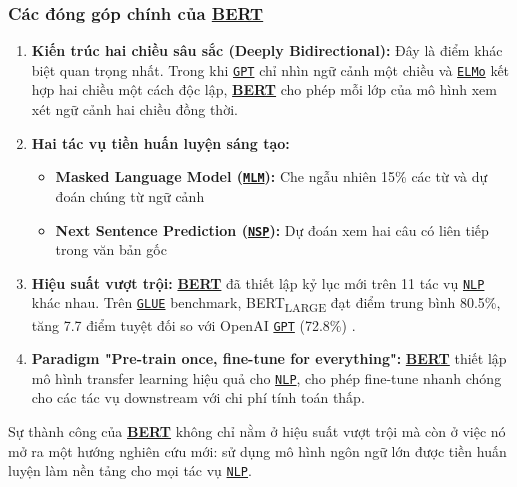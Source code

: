 \subsubsection{Các đóng góp chính của \hyperref[acro:bert]{\textbf{BERT}}}
\begin{enumerate}
    \item \textbf{Kiến trúc hai chiều sâu sắc (Deeply Bidirectional):} Đây là điểm khác biệt quan trọng nhất. Trong khi \hyperref[acro:gpt]{\texttt{GPT}} chỉ nhìn ngữ cảnh một chiều và \hyperref[acro:elmo]{\texttt{ELMo}} kết hợp hai chiều một cách độc lập, \hyperref[acro:bert]{\textbf{BERT}} cho phép mỗi lớp của mô hình xem xét ngữ cảnh hai chiều đồng thời.
    
    \item \textbf{Hai tác vụ tiền huấn luyện sáng tạo:}
    \begin{itemize}
        \item \textbf{Masked Language Model (\hyperref[acro:mlm]{\texttt{MLM}}):} Che ngẫu nhiên 15\% các từ và dự đoán chúng từ ngữ cảnh
        \item \textbf{Next Sentence Prediction (\hyperref[acro:nsp]{\texttt{NSP}}):} Dự đoán xem hai câu có liên tiếp trong văn bản gốc
    \end{itemize}
    
    \item \textbf{Hiệu suất vượt trội:} \hyperref[acro:bert]{\textbf{BERT}} đã thiết lập kỷ lục mới trên 11 tác vụ \hyperref[acro:nlp]{\texttt{NLP}} khác nhau. Trên \hyperref[acro:glue]{\texttt{GLUE}} benchmark, BERT\textsubscript{LARGE} đạt điểm trung bình 80.5\%, tăng 7.7 điểm tuyệt đối so với OpenAI \hyperref[acro:gpt]{\texttt{GPT}} (72.8\%) \cite{devlin2018bert}.
    
    \item \textbf{Paradigm "Pre-train once, fine-tune for everything":} \hyperref[acro:bert]{\textbf{BERT}} thiết lập mô hình transfer learning hiệu quả cho \hyperref[acro:nlp]{\texttt{NLP}}, cho phép fine-tune nhanh chóng cho các tác vụ downstream với chi phí tính toán thấp.
\end{enumerate}

Sự thành công của \hyperref[acro:bert]{\textbf{BERT}} không chỉ nằm ở hiệu suất vượt trội mà còn ở việc nó mở ra một hướng nghiên cứu mới: sử dụng mô hình ngôn ngữ lớn được tiền huấn luyện làm nền tảng cho mọi tác vụ \hyperref[acro:nlp]{\texttt{NLP}}.

